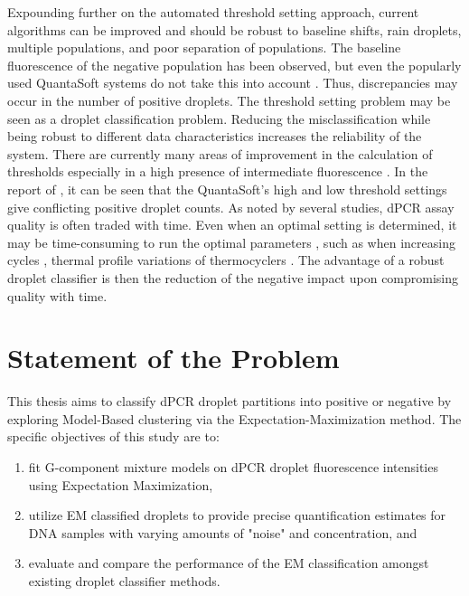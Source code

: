Expounding further on the automated threshold setting approach, current algorithms can be improved and should be robust to baseline shifts, rain droplets, multiple populations, and poor separation of populations. The baseline fluorescence of the negative population has been observed, but even the popularly used QuantaSoft systems do not take this into account \cite{Trypsteen2015}. Thus, discrepancies may occur in the number of positive droplets. The threshold setting problem may be seen as a droplet classification problem. Reducing the misclassification while being robust to different data characteristics increases the reliability of the system. There are currently many areas of improvement in the calculation of thresholds especially in a high presence of intermediate fluorescence \cite{Demeke2018}. In the report of , it can be seen that the QuantaSoft's high and low threshold settings give conflicting positive droplet counts. As noted by several studies, dPCR assay quality is often traded with time. Even when an optimal setting is determined, it may be time-consuming to run the optimal parameters \cite{Witte2016}, such as when increasing cycles \cite{Lievens2016}, thermal profile variations of thermocyclers \cite{Young2008}. The advantage of a robust droplet classifier is then the reduction of the negative impact upon compromising quality with time.


\section{Statement of the Problem}
\label{sec:statementprob}

This thesis aims to classify dPCR droplet partitions into positive or negative by exploring Model-Based clustering via the Expectation-Maximization method. The specific objectives of this study are to:
\begin{enumerate}
    \item fit G-component mixture models on dPCR droplet fluorescence intensities using Expectation Maximization,
    \item utilize EM classified droplets to provide precise quantification estimates for DNA samples with varying amounts of "noise" and concentration, and
    \item evaluate and compare the performance of the EM classification amongst existing droplet classifier methods. 
\end{enumerate}

